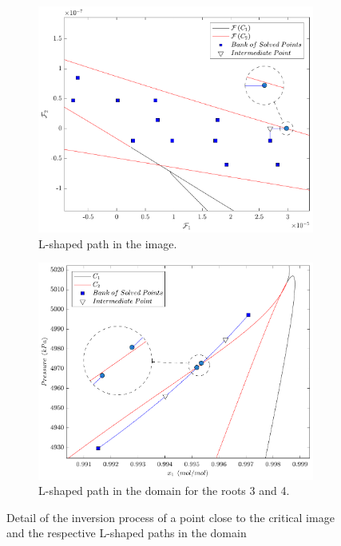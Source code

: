 \documentclass[journal=iecred,manuscript=article]{achemso}
\theoremstyle{definition}
\theoremstyle{remark}
\begin{document}
\begin{figure}
\centering
\begin{subfigure}{.48\textwidth}
  \centering
  \includegraphics[width=\linewidth]{caminho_L_degeneracao_imagem_new.pdf}
  \caption{L-shaped path in the image.}
  \label{fig:L_path_image}
\end{subfigure}\hfill
\begin{subfigure}{.48\textwidth}
  \centering
  \includegraphics[width=\linewidth]{caminhos_L_degeneracao_dominio_new.pdf}
  \caption{L-shaped path in the domain for the roots 3 and 4.}
  \label{fig:L_path_domain}
\end{subfigure}
\caption{Detail of the inversion process of a point close to the critical image and the respective L-shaped paths in the domain}
\label{fig:L_path_domain_image}
\end{figure}
\end{document}
